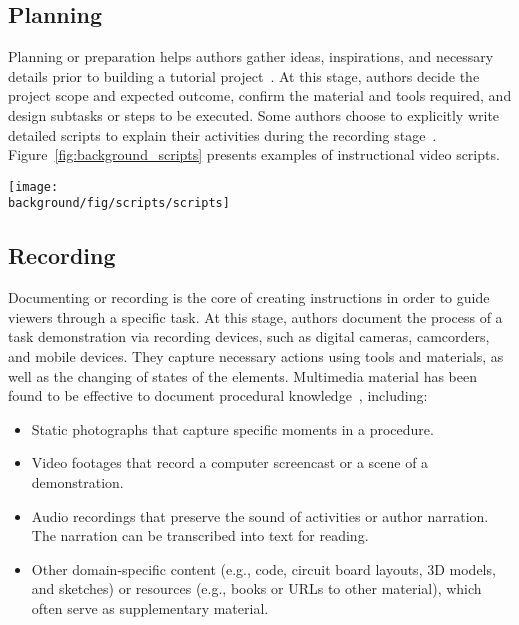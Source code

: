 \subsection{Planning}
Planning or preparation helps authors gather ideas, inspirations, and necessary details prior to building a tutorial project~\cite{Torrey:2007he}. At this stage, authors decide the project scope and expected outcome, confirm the material and tools required, and design subtasks or steps to be executed. Some authors choose to explicitly write detailed scripts to explain their activities during the recording stage~\cite{Chi:2013:DGC:2501988.2502052}. Figure~\ref{fig:background_scripts} presents examples of instructional video scripts.

\begin{figure*}[th!]
  \centering
  \texttt{[image: \\background/fig/scripts/scripts]}
  \caption{Example scripts for instructional videos about a) food safety~\protect\cite{WisconsinFoodSafetyScript} and b) cooking ~\protect\cite{SouthernIllinoisScript}. Each includes video shot(s) and narration, some with additional notes on the actions. High-level structure can also be specified, such as ``introduction'' and ``conclusion.''}
  \label{fig:background_scripts}
\end{figure*}

\subsection{Recording}
Documenting or recording is the core of creating instructions in order to guide viewers through a specific task. At this stage, authors document the process of a task demonstration via recording devices, such as digital cameras, camcorders, and mobile devices. They capture necessary actions using tools and materials, as well as the changing of states of the elements.
%
Multimedia material has been found to be effective to document procedural knowledge~\cite{Kuznetsov:2010:REA:1868914.1868950,Wakkary:2015:TAH:2702123.2702550}, including:

\begin{itemize}
  \item Static photographs that capture specific moments in a procedure.
  \item Video footages that record a computer screencast or a scene of a demonstration.
  \item Audio recordings that preserve the sound of activities or author narration. The narration can be transcribed into text for reading.
  \item Other domain-specific content (e.g., code, circuit board layouts, 3D models, and sketches) or resources (e.g., books or URLs to other material), which often serve as supplementary material.
\end{itemize}

